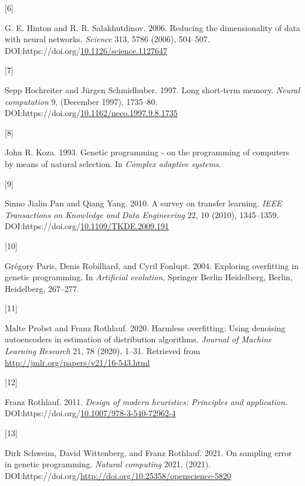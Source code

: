 \documentclass[
  11pt,
]{article}
\newlength{\cslhangindent}
\newlength{\csllabelwidth}
\newlength{\cslentryspacingunit} %
\newenvironment{CSLReferences}[2] %
 {%
  \setlength{\parindent}{0pt}
  \ifodd #1
  \let\oldpar\par
  \def\par{\hangindent=\cslhangindent\oldpar}
  \fi
  \setlength{\parskip}{#2\cslentryspacingunit}
 }%
 {}
\newcommand{\CSLLeftMargin}[1]{\parbox[t]{\csllabelwidth}{#1}}
\newcommand{\CSLRightInline}[1]{\parbox[t]{\linewidth - \csllabelwidth}{#1}\break}
\begin{document}
\begin{CSLReferences}{0}{0}
\leavevmode{}%
\CSLLeftMargin{{[}6{]} }%
\CSLRightInline{G. E. Hinton and R. R. Salakhutdinov. 2006. Reducing the dimensionality of data with neural networks. \emph{Science} 313, 5786 (2006), 504--507. DOI:https://doi.org/\href{https://doi.org/10.1126/science.1127647}{10.1126/science.1127647}}

\leavevmode{}%
\CSLLeftMargin{{[}7{]} }%
\CSLRightInline{Sepp Hochreiter and Jürgen Schmidhuber. 1997. Long short-term memory. \emph{Neural computation} 9, (December 1997), 1735--80. DOI:https://doi.org/\href{https://doi.org/10.1162/neco.1997.9.8.1735}{10.1162/neco.1997.9.8.1735}}

\leavevmode{}%
\CSLLeftMargin{{[}8{]} }%
\CSLRightInline{John R. Koza. 1993. Genetic programming - on the programming of computers by means of natural selection. In \emph{Complex adaptive systems}.}

\leavevmode{}%
\CSLLeftMargin{{[}9{]} }%
\CSLRightInline{Sinno Jialin Pan and Qiang Yang. 2010. A survey on transfer learning. \emph{IEEE Transactions on Knowledge and Data Engineering} 22, 10 (2010), 1345--1359. DOI:https://doi.org/\href{https://doi.org/10.1109/TKDE.2009.191}{10.1109/TKDE.2009.191}}

\leavevmode{}%
\CSLLeftMargin{{[}10{]} }%
\CSLRightInline{Grégory Paris, Denis Robilliard, and Cyril Fonlupt. 2004. Exploring overfitting in genetic programming. In \emph{Artificial evolution}, Springer Berlin Heidelberg, Berlin, Heidelberg, 267--277.}

\leavevmode{}%
\CSLLeftMargin{{[}11{]} }%
\CSLRightInline{Malte Probst and Franz Rothlauf. 2020. Harmless overfitting: Using denoising autoencoders in estimation of distribution algorithms. \emph{Journal of Machine Learning Research} 21, 78 (2020), 1--31. Retrieved from \url{http://jmlr.org/papers/v21/16-543.html}}

\leavevmode{}%
\CSLLeftMargin{{[}12{]} }%
\CSLRightInline{Franz Rothlauf. 2011. \emph{Design of modern heuristics: Principles and application}. DOI:https://doi.org/\href{https://doi.org/10.1007/978-3-540-72962-4}{10.1007/978-3-540-72962-4}}

\leavevmode{}%
\CSLLeftMargin{{[}13{]} }%
\CSLRightInline{Dirk Schweim, David Wittenberg, and Franz Rothlauf. 2021. On sampling error in genetic programming. \emph{Natural computing} 2021, (2021). DOI:https://doi.org/\url{http://doi.org/10.25358/openscience-5820}}


\end{CSLReferences}
\end{document}
